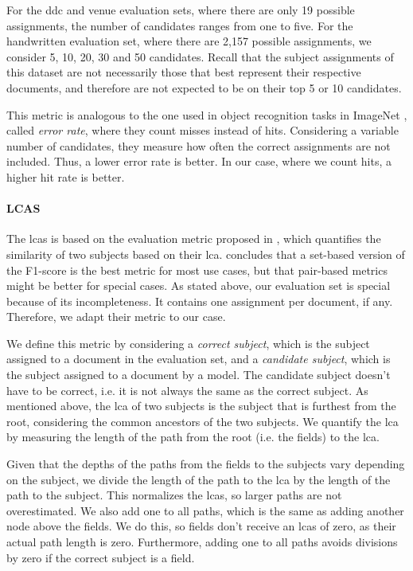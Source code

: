 For the \acrshort{ddc} and venue evaluation sets, where there are only 19 possible assignments, the number of candidates ranges from one to five. For the handwritten evaluation set, where there are 2,157 possible assignments, we consider 5, 10, 20, 30 and 50 candidates. Recall that the subject assignments of this dataset are not necessarily those that best represent their respective documents, and therefore are not expected to be on their top 5 or 10 candidates.
 
This metric is analogous to the one used in object recognition tasks in ImageNet \cite{russakovsky2015imagenet}, called \textit{error rate}, where they count misses instead of hits. Considering a variable number of candidates, they measure how often the correct assignments are not included. Thus, a lower error rate is better. In our case, where we count hits, a higher hit rate is better.

\paragraph{LCAS} \mbox{}

The \acrfull{lcas} is based on the evaluation metric proposed in \cite{kosmopoulos2015evaluation}, which quantifies the similarity of two subjects based on their \acrfull{lca}. \cite{kosmopoulos2015evaluation} concludes that a set-based version of the F1-score is the best metric for most use cases, but that pair-based metrics might be better for special cases. As stated above, our evaluation set is special because of its incompleteness. It contains one assignment per document, if any. Therefore, we adapt their metric to our case.

We define this metric by considering a \textit{correct subject}, which is the subject assigned to a document in the evaluation set, and a \textit{candidate subject}, which is the subject assigned to a document by a model. The candidate subject doesn't have to be correct, i.e. it is not always the same as the correct subject. As mentioned above, the \acrshort{lca} of two subjects is the subject that is furthest from the root, considering the common ancestors of the two subjects. We quantify the \acrshort{lca} by measuring the length of the path from the root (i.e. the fields) to the \acrshort{lca}.

Given that the depths of the paths from the fields to the subjects vary depending on the subject, we divide the length of the path to the \acrshort{lca} by the length of the path to the subject. This normalizes the \acrshort{lcas}, so larger paths are not overestimated. We also add one to all paths, which is the same as adding another node above the fields. We do this, so fields don't receive an \acrshort{lcas} of zero, as their actual path length is zero. Furthermore, adding one to all paths avoids divisions by zero if the correct subject is a field.

